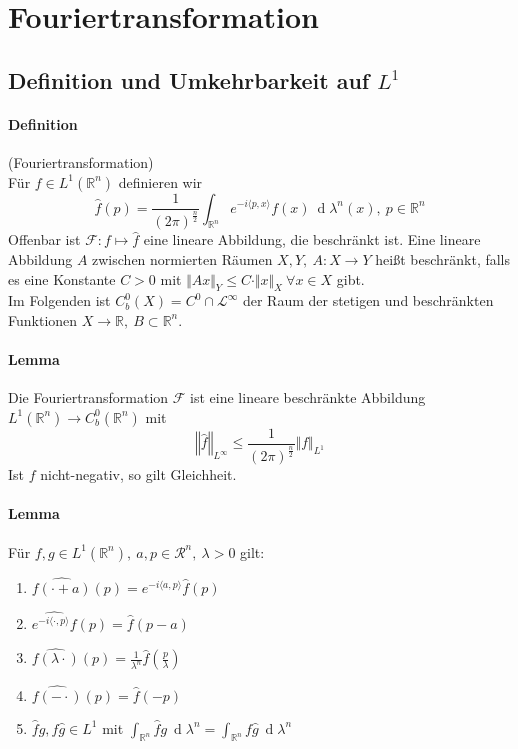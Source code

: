 \documentclass[12pt,a4paper,fleqn]{article}
\def\R{{\mathbb{R}}}
\def\d{{\operatorname{d}}}
\begin{document}
\section{Fouriertransformation}

\subsection{Definition und Umkehrbarkeit auf $L^1$}

\paragraph{Definition} (Fouriertransformation)\\
Für $f \in L^1(\R^n)$ definieren wir
\begin{displaymath}
\widehat{f}(p) = \frac{1}{(2\pi)^{\frac{n}{2}}} \int_{\mathbb{R}^n} e^{-i \langle p, x \rangle} f(x)\ \d\lambda^n(x),\ p \in \mathbb{R}^n
\end{displaymath}
Offenbar ist $\mathscr{F}\colon f \mapsto \widehat{f}$ eine lineare Abbildung, die beschränkt ist. Eine lineare Abbildung $A$ zwischen normierten Räumen $X, Y,\ A\colon X \rightarrow Y$ heißt beschränkt, falls es eine Konstante $C>0$ mit $\Vert Ax \Vert_Y \leq C \cdot \Vert x \Vert_X\ \forall x \in X$ gibt. \\
Im Folgenden ist $C^0_b(X) = C^0 \cap \mathscr{L}^\infty$ der Raum der stetigen und beschränkten Funktionen $X \rightarrow \mathbb{R},\ B\subset \mathbb{R}^n$.

\paragraph{Lemma} Die Fouriertransformation $\mathscr{F}$ ist eine lineare beschränkte Abbildung \linebreak\mbox{$L^1(\mathbb{R}^n) \rightarrow C_b^0(\mathbb{R}^n)$} mit
\begin{displaymath}
\left\Vert \widehat{f} \right\Vert_{L^\infty} \leq \frac{1}{(2\pi)^{\frac{n}{2}}} \Vert f \Vert_{L^1}
\end{displaymath}
Ist $f$ nicht-negativ, so gilt Gleichheit.

\paragraph{Lemma} Für $f, g \in L^1(\mathbb{R}^n),\ a, p \in \mathcal{R}^n,\ \lambda >0$ gilt:
\begin{enumerate}
\item$\widehat{f(\cdot + a)}(p) = e^{-i\langle a, p\rangle} \widehat{f}(p)$
\item$\widehat{e^{-i\langle \cdot, p\rangle} f}(p) = \widehat{f}(p-a)$
\item$\widehat{f(\lambda\cdot)}(p) = \frac{1}{\lambda^n} \widehat{f}(\frac{p}{\lambda})$
\item$\widehat{f(-\cdot)}(p) = \widehat{f}(-p)$
\item$\widehat{f}g, f\widehat{g} \in L^1$ mit $\int_{\mathbb{R}^n} \widehat{f}g\ \d\lambda^n = \int_{\mathbb{R}^n} f\widehat{g}\ \d\lambda^n$
\end{enumerate}
\end{document}
